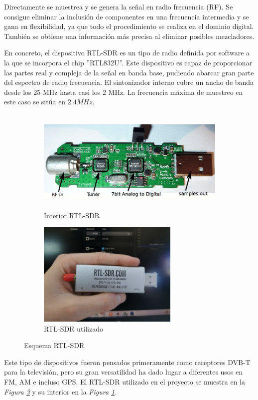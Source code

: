 \documentclass[a4paper,openright,12pt]{article}
\begin{document}
Directamente se muestrea y se genera la señal en radio frecuencia (RF). Se consigue eliminar la inclusión de componentes en una frecuencia intermedia y se gana en flexibilidad, ya que todo el procedimiento se realiza en el dominio digital. También se obtiene una información más precisa al eliminar posibles mezcladores.

	 En concreto, el dispositivo RTL-SDR es un tipo de radio definida por software a la que se incorpora el chip ''RTL832U''. Este dispositivo es capaz de proporcionar las partes real y compleja de la señal en banda base, pudiendo abarcar gran parte del espectro de radio frecuencia. El sintonizador interno cubre un ancho de banda desde los 25 MHz hasta casi los 2 MHz. La frecuencia máxima de muestreo en este caso se sitúa en $2.4 MHz$.
	 
	 \begin{figure}[!tbp]
  \begin{subfigure}[b]{0.49\textwidth}
    \includegraphics[width=\textwidth, height=5cm]{imagenes/inner_RTL.JPG}
    \caption{Interior RTL-SDR}
    \label{inner_RTL}
  \end{subfigure}
  \hfill
  \begin{subfigure}[b]{0.49\textwidth}
    \includegraphics[width=\textwidth, height=5cm]{imagenes/rtl.JPG}
    \caption{RTL-SDR utilizado}
    \label{rtl}
  \end{subfigure}
  \caption{Esquema RTL-SDR}
\end{figure}

Este tipo de dispositivos fueron pensados primeramente como receptores DVB-T para la televisión, pero su gran versatilidad ha dado lugar a diferentes usos en FM, AM e incluso GPS.
El RTL-SDR utilizado en el proyecto se muestra en la \textit{Figura \ref{rtl}} y su interior en la \textit{Figura \ref{inner_RTL}.} 
\newpage
\end{document}
